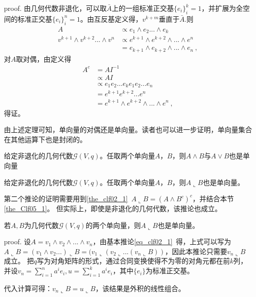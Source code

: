 proof.
由几何代数非退化，可以取$\bar A$上的一组标准正交基$\{e_i\}^k_i=1$，并扩展为全空间的标准正交基$\{e_i\}^n_i=1$。由互反基定义得，$v^{k+m}$垂直于$\bar A$.则
\begin{equation}
\begin{aligned}
A&\propto e_1\wedge e_2...\wedge e_k\\
v^{k+1}\wedge v^{k+2}...\wedge v^n&\propto e^{k+1}\wedge e^{k+2}\wedge...\wedge e^n\\
&=e_{k+1}\wedge e_{k+2}\wedge...\wedge e_n~,
\end{aligned}
\end{equation}
对$A$取对偶，由定义得
\begin{equation}
\begin{aligned}
A^c&=AI^{-1}\\
&\propto AI\\
&\propto e_1 e_2... e_k e_1 e_2... e_n\\
&=e^{k+1} e^{k+2}... e^n\\
&=e^{k+1}\wedge e^{k+2}\wedge...\wedge e^n~,
\end{aligned}
\end{equation}
得证。

由上述定理可知，单向量的对偶还是单向量。读者也可以进一步证明，单向量集合在其他运算下也是封闭的。
\begin{corollary}{}
给定非退化的几何代数$\mathcal G(V,q)$。任取两个单向量$A$，$B$，则$A\wedge B$与$A\vee B$也是单向量
\end{corollary}
\begin{corollary}{}\label{cor_Clf05_1}
给定非退化的几何代数$\mathcal G(V,q)$。任取两个单向量$A$，$B$，则$A\llcorner B$也是单向量。
\end{corollary}
第二个推论的证明需要用到\autoref{the_clf02_1}~$A\llcorner B=(A\wedge B^c)^c$，并结合本节\autoref{the_Clf05_1}。
但实际上，即使是非退化的几何代数，该推论也成立。
\begin{corollary}{}
若$A,B$为几何代数$\mathcal G(V,q)$的两个单向量，则$A\llcorner B$也是单向量。
\end{corollary}
proof.
设$A=v_1\wedge v_2\wedge...\wedge v_n$，由基本推论\autoref{eq_clf02_1}~得，上式可以写为$A\llcorner B=(v_1\wedge v_2...)\llcorner B=(v_1\llcorner (v_2\llcorner...(v_n\llcorner B))$，因此本推论只需要$v_n\llcorner B$成立。
把$q$写为对角矩阵的形式，通过合同变换使得不为零的对角元都在前$k$列，并设$v_n=\sum \limits^{n}_{i=1}a^i e_i,u=\sum \limits^{k}_{i=1}a^i e_i$，其中$\{e_i\}$为标准正交基。

代入计算可得：$v_n\llcorner B=u\llcorner B$，该结果是外积的线性组合。

